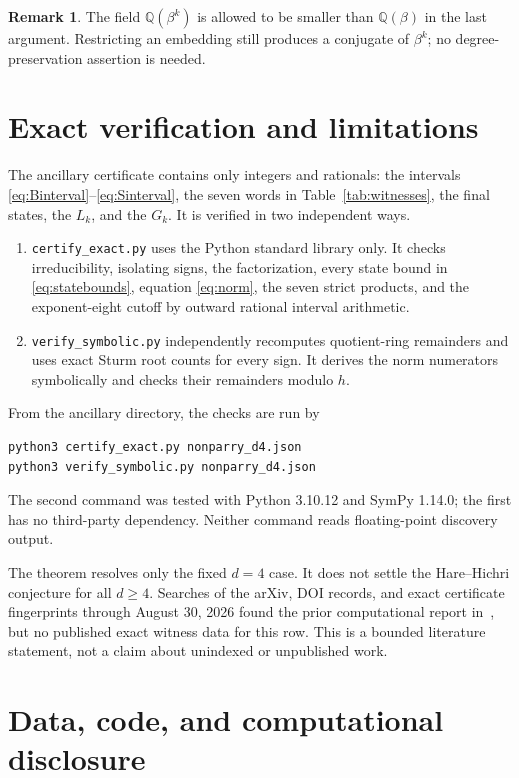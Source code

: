 \documentclass[11pt]{amsart}
\theoremstyle{definition}
\newtheorem{remark}[theorem]{Remark}
\newcommand{\Q}{\mathbb{Q}}
\begin{document}
\begin{remark}
The field $\Q(\beta^k)$ is allowed to be smaller than $\Q(\beta)$ in the last
argument.  Restricting an embedding still produces a conjugate of $\beta^k$;
no degree-preservation assertion is needed.
\end{remark}

\section{Exact verification and limitations}

The ancillary certificate contains only integers and rationals: the intervals
\eqref{eq:Binterval}--\eqref{eq:Sinterval}, the seven words in
Table~\ref{tab:witnesses}, the final states, the $L_k$, and the $G_k$.  It is
verified in two independent ways.

\begin{enumerate}
\item \texttt{certify\_exact.py} uses the Python standard library only.  It
checks irreducibility, isolating signs, the factorization, every state bound
in \eqref{eq:statebounds}, equation \eqref{eq:norm}, the seven strict products,
and the exponent-eight cutoff by outward rational interval arithmetic.
\item \texttt{verify\_symbolic.py} independently recomputes quotient-ring
remainders and uses exact Sturm root counts for every sign.  It derives the
norm numerators symbolically and checks their remainders modulo $h$.
\end{enumerate}

From the ancillary directory, the checks are run by
\begin{verbatim}
python3 certify_exact.py nonparry_d4.json
python3 verify_symbolic.py nonparry_d4.json
\end{verbatim}
The second command was tested with Python 3.10.12 and SymPy 1.14.0; the first
has no third-party dependency.  Neither command reads floating-point discovery
output.

The theorem resolves only the fixed $d=4$ case.  It does not settle the
Hare--Hichri conjecture for all $d\geq4$.  Searches of the arXiv, DOI records,
and exact certificate fingerprints through August 30, 2026 found the prior
computational report in~\cite{HareHichri2026}, but no published exact witness
data for this row.  This is a bounded literature statement, not a claim about
unindexed or unpublished work.

\section*{Data, code, and computational disclosure}
\end{document}
